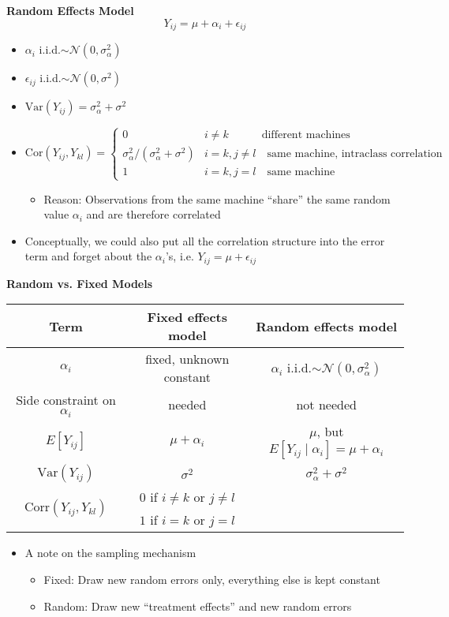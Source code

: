 \documentclass[a4paper]{article}
\begin{document}
\textbf{Random Effects Model}
\[Y_{ij}=\mu+\alpha_i+\epsilon_{ij} \]
\begin{itemize}
    \item $\alpha_i$ i.i.d.$\sim\mathcal{N}(0,\sigma_{\alpha}^2)$
    \item $\epsilon_{ij}$ i.i.d.$\sim\mathcal{N}(0,\sigma^2)$
    \item $\mathrm{Var}(Y_{ij})=\sigma_{\alpha}^2+\sigma^2$
    \item $
    \mathrm{Cor}(Y_{ij},Y_{kl})=
    \begin{cases}
    0 & i\neq k \quad\quad\quad\textrm{different machines} \\
    \sigma_{\alpha}^2/(\sigma_{\alpha}^2+\sigma^2) & i=k,j\neq l \quad\textrm{same machine, intraclass correlation} \\
    1 & i=k,j=l \quad\textrm{same machine}
    \end{cases}$
    \begin{itemize}
        \item Reason: Observations from the same machine ``share'' the same random value $\alpha_i$ and are therefore correlated
    \end{itemize}
    \item Conceptually, we could also put all the correlation structure into the error term and forget about the $\alpha_i$'s, i.e. $Y_{ij}=\mu+\epsilon_{ij}$
\end{itemize}

\textbf{Random vs. Fixed Models}
\begin{table}[!htbp]
    \centering
    \begin{tabular}{c|c|c}
    \textbf{Term} & \textbf{Fixed effects model} & \textbf{Random effects model} \\
    \hline
    $\alpha_i$ & fixed, unknown constant & $\alpha_i$ i.i.d.$\sim\mathcal{N}(0,\sigma_{\alpha}^2)$ \\
    \hline
    Side constraint on $\alpha_i$ & needed & not needed \\
    \hline
    $E[Y_{ij}]$ & $\mu+\alpha_i$ & $\mu$, but $E[Y_{ij}\mid\alpha_i]=\mu+\alpha_i$ \\
    \hline
    $\mathrm{Var}(Y_{ij})$ & $\sigma^2$ & $\sigma_{\alpha}^2+\sigma^2$ \\
    \hline
     \multirow{ 2}{*}{$\mathrm{Corr}(Y_{ij},Y_{kl})$} & $0$ if $i\neq k$ or $j\neq l$ &  \\ & $1$ if $i=k$ or $j=l$
    \end{tabular}
\end{table}
\begin{itemize}
    \item A note on the sampling mechanism
    \begin{itemize}
        \item Fixed: Draw new random errors only, everything else is kept constant
        \item Random: Draw new ``treatment effects'' and new random errors
    \end{itemize}
\end{itemize}
\end{document}
